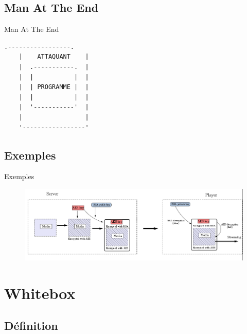 \documentclass{beamer}
\begin{document}
\subsection{Man At The End}

\begin{frame}[fragile]{Man At The End}

  \begin{Verbatim}[samepage=true]
    .-----------------. 
    |    ATTAQUANT    |
    |  .-----------.  |  
    |  |           |  |  
    |  | PROGRAMME |  | 
    |  |           |  | 
    |  '-----------'  |
    |                 |
    '-----------------'
  \end{Verbatim}
\end{frame}

\subsection{Exemples}

\begin{frame}{Exemples}

  \begin{figure}[h]
    \centering
    \includegraphics[scale=0.50]{./images/drms.png}
  \end{figure}

\end{frame}

\section{Whitebox}

\subsection{Définition}
\end{document}
